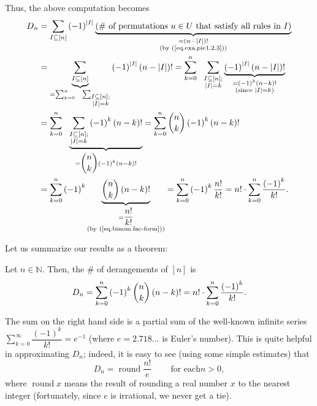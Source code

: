 Thus, the above computation becomes%
\begin{align*}
D_{n}  &  =\sum_{I\subseteq\left[  n\right]  }\left(  -1\right)  ^{\left\vert
I\right\vert }\underbrace{\left(  \text{\# of permutations }u\in U\text{ that
satisfy all rules in }I\right)  }_{\substack{=\left(  n-\left\vert
I\right\vert \right)  !\\\text{(by (\ref{eq.exa.pie1.2.3}))}}}\\
&  =\underbrace{\sum_{I\subseteq\left[  n\right]  }}_{=\sum_{k=0}^{n}%
\ \ \sum_{\substack{I\subseteq\left[  n\right]  ;\\\left\vert I\right\vert
=k}}}\left(  -1\right)  ^{\left\vert I\right\vert }\left(  n-\left\vert
I\right\vert \right)  !=\sum_{k=0}^{n}\ \ \sum_{\substack{I\subseteq\left[
n\right]  ;\\\left\vert I\right\vert =k}}\underbrace{\left(  -1\right)
^{\left\vert I\right\vert }\left(  n-\left\vert I\right\vert \right)
!}_{\substack{=\left(  -1\right)  ^{k}\left(  n-k\right)  !\\\text{(since
}\left\vert I\right\vert =k\text{)}}}\\
&  =\sum_{k=0}^{n}\ \ \underbrace{\sum_{\substack{I\subseteq\left[  n\right]
;\\\left\vert I\right\vert =k}}\left(  -1\right)  ^{k}\left(  n-k\right)
!}_{=\dbinom{n}{k}\left(  -1\right)  ^{k}\left(  n-k\right)  !}=\sum_{k=0}%
^{n}\dbinom{n}{k}\left(  -1\right)  ^{k}\left(  n-k\right)  !\\
&  =\sum_{k=0}^{n}\left(  -1\right)  ^{k}\underbrace{\dbinom{n}{k}\left(
n-k\right)  !}_{\substack{=\dfrac{n!}{k!}\\\text{(by (\ref{eq.binom.fac-form}%
))}}}=\sum_{k=0}^{n}\left(  -1\right)  ^{k}\dfrac{n!}{k!}=n!\cdot\sum
_{k=0}^{n}\dfrac{\left(  -1\right)  ^{k}}{k!}.
\end{align*}


Let us summarize our results as a theorem:

\begin{theorem}
\label{thm.pie.count-der}Let $n\in\mathbb{N}$. Then, the \# of derangements of
$\left[  n\right]  $ is
\[
D_{n}=\sum_{k=0}^{n}\left(  -1\right)  ^{k}\dbinom{n}{k}\left(  n-k\right)
!=n!\cdot\sum_{k=0}^{n}\dfrac{\left(  -1\right)  ^{k}}{k!}.
\]

\end{theorem}

\begin{remark}
The sum on the right hand side is a partial sum of the well-known infinite
series $\sum\limits_{k=0}^{\infty}\dfrac{\left(  -1\right)  ^{k}}{k!}=e^{-1}$
(where $e=2.718\ldots$ is Euler's number). This is quite helpful in
approximating $D_{n}$; indeed, it is easy to see (using some simple estimates)
that%
\[
D_{n}=\operatorname*{round}\dfrac{n!}{e}\ \ \ \ \ \ \ \ \ \ \text{for each
}n>0,
\]
where $\operatorname*{round}x$ means the result of rounding a real number $x$
to the nearest integer (fortunately, since $e$ is irrational, we never get a tie).
\end{remark}

